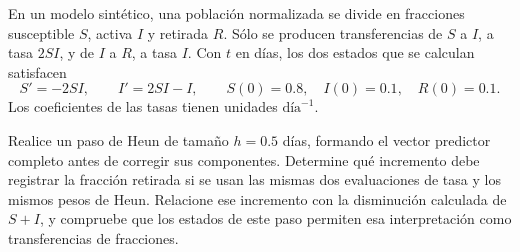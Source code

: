 En un modelo sintético, una población normalizada se divide en fracciones susceptible \(S\), activa \(I\) y retirada \(R\). Sólo se producen transferencias de \(S\) a \(I\), a tasa \(2SI\), y de \(I\) a \(R\), a tasa \(I\). Con \(t\) en días, los dos estados que se calculan satisfacen
\[
S'=-2SI,\qquad I'=2SI-I,
\qquad S(0)=0.8,\quad I(0)=0.1,\quad R(0)=0.1.
\]
Los coeficientes de las tasas tienen unidades \(\mathrm{día}^{-1}\).

Realice un paso de Heun de tamaño \(h=0.5\) días, formando el vector predictor completo antes de corregir sus componentes. Determine qué incremento debe registrar la fracción retirada si se usan las mismas dos evaluaciones de tasa y los mismos pesos de Heun. Relacione ese incremento con la disminución calculada de \(S+I\), y compruebe que los estados de este paso permiten esa interpretación como transferencias de fracciones.
